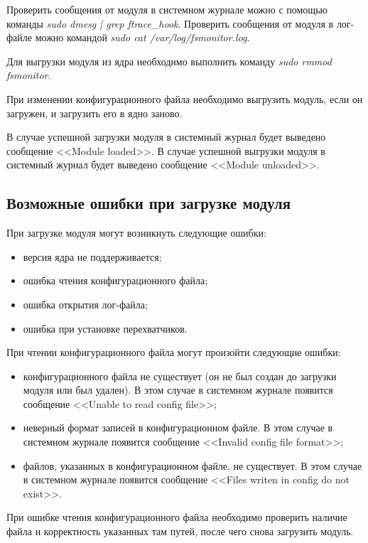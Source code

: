 \documentclass[a4paper,14pt]{article}
\begin{document}
Проверить сообщения от модуля в системном журнале можно с помощью команды \textit{sudo dmesg | grep ftrace\_hook}. Проверить сообщения от модуля в лог-файле можно командой \textit{sudo cat /var/log/fsmonitor.log}.

Для выгрузки модуля из ядра необходимо выполнить команду \textit{sudo rmmod fsmonitor}.

При изменении конфигурационного файла необходимо выгрузить модуль, если он загружен, и загрузить его в ядно заново.

В случае успешной загрузки модуля в системный журнал будет выведено сообщение <<Module loaded>>. В случае успешной выгрузки модуля в системный журнал будет выведено сообщение <<Module unloaded>>.

\subsection{Возможные ошибки при загрузке модуля}

При загрузке модуля могут возникнуть следующие ошибки:

\begin{itemize}
	\item версия ядра не поддерживается;
	\item ошибка чтения конфигурационного файла;
	\item ошибка открытия лог-файла;
	\item ошибка при установке перехватчиков.
\end{itemize}

При чтении конфигурационного файла могут произойти следующие ошибки:

\begin{itemize}
	\item конфигурационного файла не существует (он не был создан до загрузки модуля или был удален). В этом случае в системном журнале появится сообщение <<Unable to read config file>>;
	\item неверный формат записей в конфигурационном файле. В этом случае в системном журнале появится сообщение <<Invalid config file format>>;
	\item файлов, указанных в конфигурационном файле, не существует. В этом случае в системном журнале появится сообщение <<Files writen in config do not exist>>.
\end{itemize}

При ошибке чтения конфигурационного файла необходимо проверить наличие файла и корректность указанных там путей, после чего снова загрузить модуль.
\end{document}
